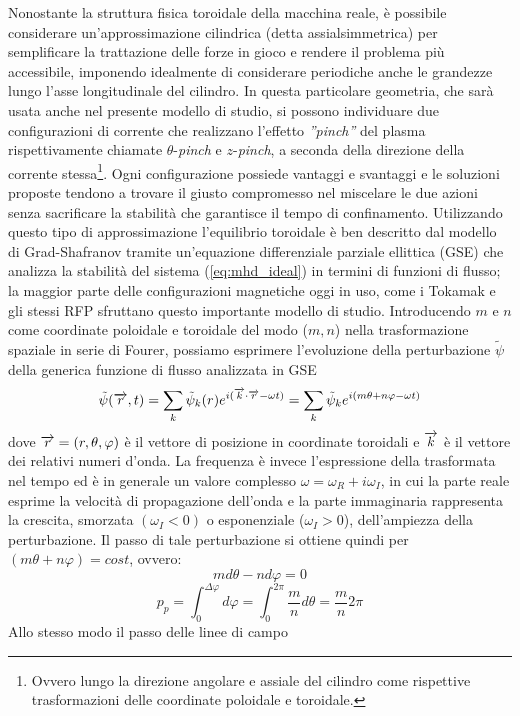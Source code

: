 Nonostante la struttura fisica toroidale della macchina reale, è
possibile considerare un'approssimazione cilindrica (detta
assialsimmetrica) per semplificare la trattazione delle forze in gioco e
rendere il problema più accessibile, imponendo idealmente di considerare
periodiche anche le grandezze lungo l'asse longitudinale del
cilindro. In questa particolare geometria, che sarà usata anche nel
presente modello di studio, si possono individuare due configurazioni di
corrente che realizzano l'effetto \emph{''pinch''} del plasma
\cite{fridberg}\cite{ortolani} rispettivamente chiamate
$\theta$-\emph{pinch} e $z$-\emph{pinch}, a seconda della direzione
della corrente stessa\footnote{Ovvero lungo la direzione angolare e
assiale del cilindro come rispettive trasformazioni delle coordinate
poloidale e toroidale.}. Ogni configurazione possiede vantaggi e
svantaggi e le soluzioni proposte tendono a trovare il giusto
compromesso nel miscelare le due azioni senza sacrificare la stabilità
che garantisce il tempo di confinamento\cite{boydsand}.  Utilizzando
questo tipo di approssimazione l'equilibrio toroidale è ben descritto
dal modello di Grad-Shafranov tramite un'equazione differenziale
parziale ellittica (GSE) che analizza la stabilità del sistema
(\ref{eq:mhd_ideal}) in termini di funzioni di flusso\cite{boidsand}; la
maggior parte delle configurazioni magnetiche oggi in uso, come i
Tokamak e gli stessi RFP sfruttano questo importante modello di studio.
Introducendo $m$ e $n$ come coordinate poloidale e toroidale del modo
($m,n$) nella trasformazione spaziale in serie di Fourer, possiamo
esprimere l'evoluzione della perturbazione $\tilde{\psi}$ della generica
funzione di flusso analizzata in GSE
\begin{equation}
 \tilde{\psi}(\overrightarrow{r},t) =
  \sum_k{ \tilde{\psi}_k(r) e^{ i(\overrightarrow{k} \cdot \overrightarrow{r} - \omega
  t) } } =
  \sum_k{ \tilde{\psi}_k e^{ i(m\theta + n\varphi - \omega t) } }
\end{equation}
dove $\overrightarrow{r} = (r,\theta,\varphi)$ è il vettore di posizione in
coordinate toroidali e $\overrightarrow{k}$ è il vettore dei relativi numeri
d'onda. La frequenza è invece l'espressione della trasformata nel tempo
ed è in generale un valore complesso $\omega = \omega_R + i\omega_I$,
in cui la parte reale esprime la velocità di propagazione dell'onda e la
parte immaginaria rappresenta la crescita, smorzata $(\omega_I <0)$ o
esponenziale ($\omega_I >0$), dell'ampiezza della perturbazione.  Il passo
di tale perturbazione si ottiene quindi per $(m\theta + n\varphi) =
cost$, ovvero: $$ md\theta -nd\varphi = 0$$ $$ p_p =
\int_0^{\Delta\varphi}d\varphi = \int_0^{2\pi}\frac{m}{n}d\theta =
\frac{m}{n}2\pi$$ Allo stesso modo il passo delle linee di campo
